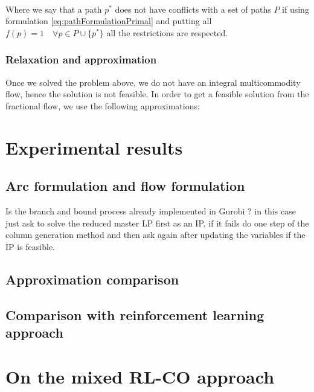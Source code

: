 \documentclass[14pt,a4paper]{article}
\theoremstyle{definition}
\numberwithin{equation}{subsection}
\begin{document}
$ $\\

Where we say that a path $p^*$ does not have conflicts with a set of paths $P$ if using formulation \eqref{eq:pathFormulationPrimal} and putting all $f(p) = 1 \quad \forall p\in P \cup \{p^*\}$ all the restrictions are respected.



\subsubsection{Relaxation and approximation}

Once we solved the problem above, we do not have an integral multicommodity flow, hence the solution is not feasible. In order to get a feasible solution from the fractional flow, we use the   following approximations:




\newpage
\section{Experimental results}
\label{results}
\subsection{Arc formulation and flow formulation}
\label{results:arcsVSflow}

Is the branch and bound process already implemented in Gurobi ? in this case just ask to solve the reduced master LP first as an IP, if it fails do one step of the column generation method and then ask again after updating the variables if the IP is feasible.

\subsection{Approximation comparison}
\subsection{Comparison with reinforcement learning approach}


\newpage
\section{On the mixed RL-CO approach}
\end{document}
